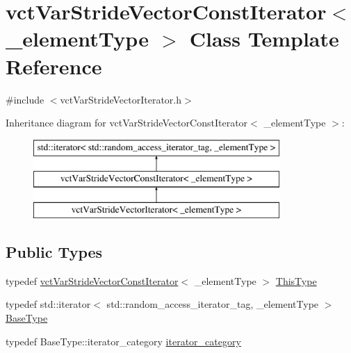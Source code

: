 \hypertarget{classvct_var_stride_vector_const_iterator}{}\section{vct\+Var\+Stride\+Vector\+Const\+Iterator$<$ \+\_\+element\+Type $>$ Class Template Reference}
\label{classvct_var_stride_vector_const_iterator}


{\ttfamily \#include $<$vct\+Var\+Stride\+Vector\+Iterator.\+h$>$}

Inheritance diagram for vct\+Var\+Stride\+Vector\+Const\+Iterator$<$ \+\_\+element\+Type $>$\+:\begin{figure}[H]
\begin{center}
\leavevmode
\includegraphics[height=3.000000cm]{d4/d94/classvct_var_stride_vector_const_iterator}
\end{center}
\end{figure}
\subsection*{Public Types}
\begin{DoxyCompactItemize}
\item 
typedef \hyperlink{classvct_var_stride_vector_const_iterator}{vct\+Var\+Stride\+Vector\+Const\+Iterator}$<$ \+\_\+element\+Type $>$ \hyperlink{classvct_var_stride_vector_const_iterator_afd99aad7dc756d227f4fb02cd569d00a}{This\+Type}
\item 
typedef std\+::iterator$<$ std\+::random\+\_\+access\+\_\+iterator\+\_\+tag, \+\_\+element\+Type $>$ \hyperlink{classvct_var_stride_vector_const_iterator_aff6a833a060e9e88031f459ab4380d1e}{Base\+Type}
\item 
typedef Base\+Type\+::iterator\+\_\+category \hyperlink{classvct_var_stride_vector_const_iterator_ab2fdb1f3617d3ac621e096e4a447694a}{iterator\+\_\+category}
\end{DoxyCompactItemize}
